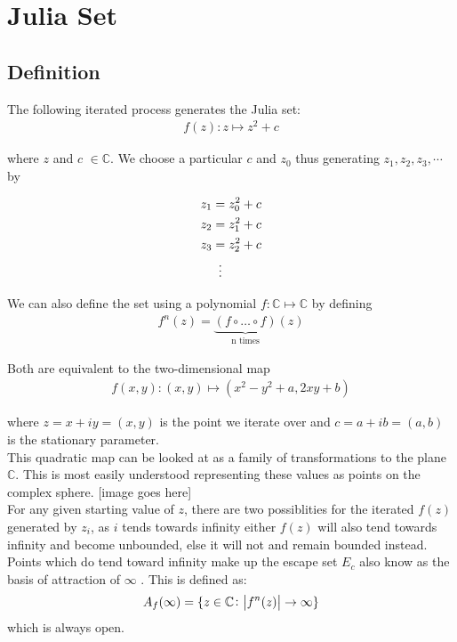 \documentclass[12pt]{article}
\begin{document}
\section{Julia Set}

\subsection{Definition}
{\parindent0pt

The following iterated process generates the Julia set\cite{Frame}:
\begin{align*}
f(z) \colon z  \mapsto z^{2} +c
\end{align*}

where $z$ and $c$ $\in \mathbb{C}$. We choose a particular $c$ and  $z_0$ thus  generating $z_1, z_2, z_3,  \cdots$ by

\begin{align*}
z_1 &= z_0^{2} + c \\
z_2 &= z_1^{2} + c \\
z_3 &= z_2^{2} + c \\
&\mathrel{\makebox[\widthof{=}]{\vdots}} \\
\end{align*}

We can also define the set using a polynomial $f \colon \mathbb{C} \mapsto \mathbb{C}$ by defining \cite{Fassett}
\begin{align*}
f^{n}(z) = \underbrace{ (f  \circ \hdots \circ f)}_{\text{n times}}(z)
\end{align*}

Both are equivalent to the two-dimensional map \cite{hypertext}
\begin{align*}
f (x,y) \colon (x,y) \mapsto (x^{2} - y^{2} + a, 2xy + b)
\end{align*}

where $z = x + iy = (x,y)$ is the point we iterate over and $c = a+ib = (a,b)$ is the stationary parameter. \\

This quadratic map can be looked at as a family of transformations to the plane $\mathbb{C}$. This is most easily understood representing these values as points on the complex sphere. \cite{hypertext} [image goes here] \\

For any given starting value of $z$, there are two possiblities for the iterated $f(z)$ generated by $z_i$, \cite{goodwin} as $i$ tends towards infinity either $f(z)$ will also tend towards infinity and become unbounded, else it will not and remain bounded instead. Points which do tend toward infinity make up the escape set $E_c$  also know as the basis of attraction of $\infty$ \cite{Fassett}. This is defined as: 
\begin{align*}
A_f(\infty) =  \{ z \in \mathbb{C} \colon \abs{ f^{n}(z)} \rightarrow \infty \}
\end{align*}
which is always open. \\

}
\end{document}
